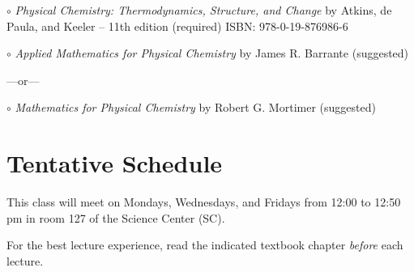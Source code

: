 \documentclass[12pt, letterpaper]{article}
\begin{document}
$\circ$ \emph{Physical Chemistry: Thermodynamics, Structure, and Change} by Atkins, de Paula, and Keeler -- 11th edition (required) ISBN: 978-0-19-876986-6

$\circ$ \emph{Applied Mathematics for Physical Chemistry} by James R. Barrante (suggested)

\vspace{-4pt}
---or---

\vspace{-4pt}
$\circ$ \emph{Mathematics for Physical Chemistry} by Robert G. Mortimer (suggested)


\section*{Tentative Schedule}
This class will meet on Mondays, Wednesdays, and Fridays from 12:00 to 12:50 pm in room 127 of the Science Center (SC).

\noindent For the best lecture experience, read the indicated textbook chapter \emph{before} each lecture.
\end{document}
